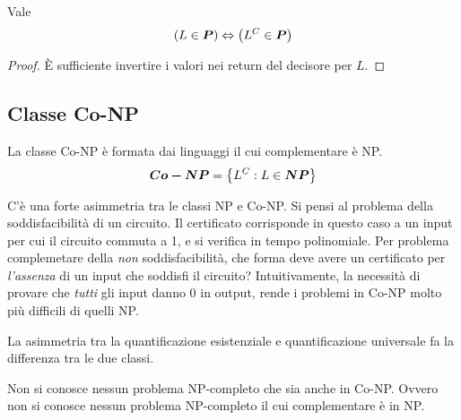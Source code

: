 \begin{lemma}
    \label{lem:lplcp}
    Vale
    \begin{equation*}
        \left( L \in \bm{P} \right)
        \Leftrightarrow
        \left( L^C \in \bm{P} \right)
    \end{equation*}
    \begin{proof}
        È sufficiente invertire i valori nei return del decisore per $L$.
    \end{proof}
\end{lemma}

\subsection{Classe Co-NP}
\begin{definition}[Classe Co-NP]
    \label{def:classeconp}
    La classe Co-NP è formata dai linguaggi il cui complementare è NP.
    \begin{equation*}
        \bm{Co-NP} = \left\{ L^C : L \in \bm{NP} \right\}
    \end{equation*}
\end{definition}
C'è una forte asimmetria tra le classi NP e Co-NP.
Si pensi al problema della soddisfacibilità di un circuito. Il certificato corrisponde in questo caso a un input per cui il circuito commuta a 1, e si verifica in tempo polinomiale.
Per problema complemetare della \emph{non} soddisfacibilità, che forma deve avere un certificato per \emph{l'assenza} di un input che soddisfi il circuito?
Intuitivamente, la necessità di provare che \emph{tutti} gli input danno 0 in output, rende i problemi in Co-NP molto più difficili di quelli NP.

La asimmetria tra la quantificazione esistenziale e quantificazione universale fa la differenza tra le due classi.

Non si conosce nessun problema NP-completo che sia anche in Co-NP.
Ovvero non si conosce nessun problema NP-completo il cui complementare è in NP.

